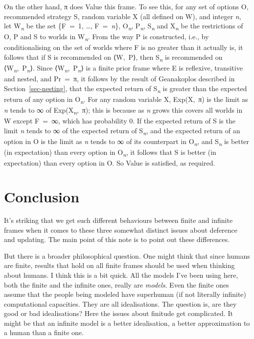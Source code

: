 \documentclass[
  12pt,
  letterpaper,
  DIV=11,
  numbers=noendperiod]{scrartcl}
\begin{document}
On the other hand, π does Value this frame. To see this, for any set of
options O, recommended strategy S, random variable X (all defined on W),
and integer \emph{n}, let W\textsubscript{\emph{n}} be the set \{F~=~1,
\ldots, F~=~\emph{n}\}, O\textsubscript{\emph{n}},
P\textsubscript{\emph{n}}, S\textsubscript{\emph{n}} and
X\textsubscript{\emph{n}} be the restrictions of O, P and S to worlds in
W\textsubscript{\emph{n}}. From the way P is constructed, i.e., by
conditionalising on the set of worlds where F is no greater than it
actually is, it follows that if S is recommended on ⟨W,~P⟩, then
S\textsubscript{\emph{n}} is recommended on
⟨W\textsubscript{\emph{n}},~P\textsubscript{\emph{n}}⟩. Since
⟨W\textsubscript{\emph{n}},~P\textsubscript{\emph{n}}⟩ is a finite prior
frame where E is reflexive, transitive and nested, and Pr~=~π, it
follows by the result of Geanakoplos described in
Section~\ref{sec-nesting}, that the expected return of
S\textsubscript{\emph{n}} is greater than the expected return of any
option in O\textsubscript{\emph{n}}. For any random variable X,
Exp(X,~π) is the limit as \emph{n} tends to ∞ of
Exp(X\textsubscript{\emph{n}},~π); this is because as \emph{n} grows
this covers all worlds in W except F~=~∞, which has probability 0. If
the expected return of S is the limit \emph{n} tends to ∞ of the
expected return of S\emph{\textsubscript{n}}, and the expected return of
an option in O is the limit as \emph{n} tends to ∞ of its counterpart in
O\textsubscript{\emph{n}}, and S\emph{\textsubscript{n}} is better (in
expectation) than every option in O\textsubscript{\emph{n}}, it follows
that S is better (in expectation) than every option in O. So Value is
satisfied, as required.

\section{Conclusion}\label{conclusion}

It's striking that we get such different behaviours between finite and
infinite frames when it comes to these three somewhat distinct issues
about deference and updating. The main point of this note is to point
out these differences.

But there is a broader philosophical question. One might think that
since humans are finite, results that hold on all finite frames should
be used when thinking about humans. I think this is a bit quick. All the
models I've been using here, both the finite and the infinite ones,
really are \emph{models}. Even the finite ones assume that the people
being modeled have superhuman (if not literally infinite) computational
capacities. They are all idealisations. The question is, are they good
or bad idealisations? Here the issues about finitude get complicated. It
might be that an infinite model is a better idealisation, a better
approximation to a human than a finite one.
\end{document}
